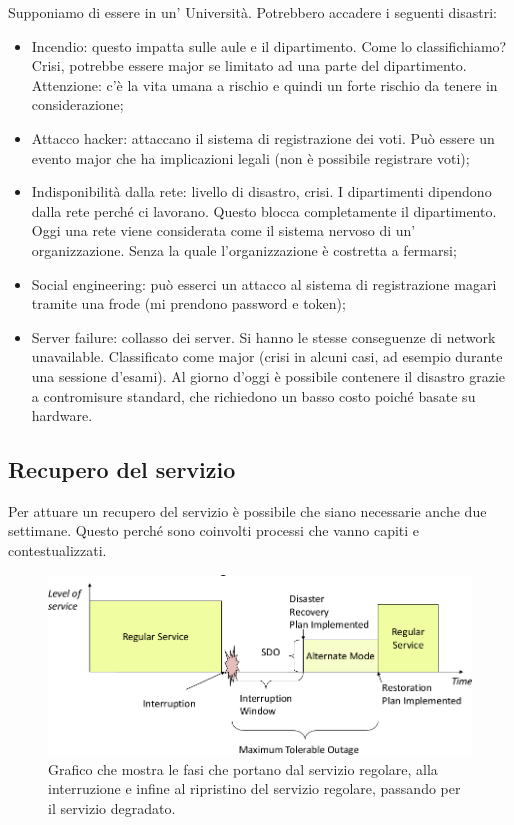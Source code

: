 Supponiamo di essere in un' Università.
Potrebbero accadere i seguenti disastri:
\begin{itemize}
 \item Incendio: questo impatta sulle aule e il dipartimento. Come lo
classifichiamo? Crisi, potrebbe essere major se limitato ad una parte del
dipartimento. Attenzione: c'è la vita umana a rischio e quindi un forte
rischio da tenere in considerazione;

 \item Attacco hacker: attaccano il sistema di registrazione dei voti. Può essere un
evento major che ha implicazioni legali (non è possibile registrare voti);

 \item Indisponibilità dalla rete: livello di disastro, crisi. I dipartimenti dipendono dalla rete perché
ci lavorano. Questo blocca completamente il dipartimento. Oggi una rete viene
considerata come il sistema nervoso di un' organizzazione. Senza la quale
l'organizzazione è costretta a fermarsi;

 \item Social engineering: può esserci un attacco al sistema di registrazione magari tramite una frode
(mi prendono password e token);

 \item Server failure: collasso dei server. Si hanno le stesse conseguenze di network unavailable.
Classificato come major (crisi in alcuni casi, ad esempio durante una sessione
d'esami). Al giorno d'oggi è possibile contenere il disastro grazie a
contromisure
standard, che richiedono un basso costo poiché basate su hardware.
\end{itemize}

\subsection{Recupero del servizio}

Per attuare un recupero del servizio è possibile che siano necessarie anche due
settimane.
Questo perché sono coinvolti processi che vanno capiti e contestualizzati.

\begin{figure}[h!]
        \begin{center}
                \includegraphics[scale=0.65]{res/img/recovery-times.png}
        \end{center}
        \caption{Grafico che mostra le fasi che portano dal servizio 
        regolare, alla interruzione e infine al ripristino del servizio 
        regolare, passando per il servizio degradato.}
\end{figure}

